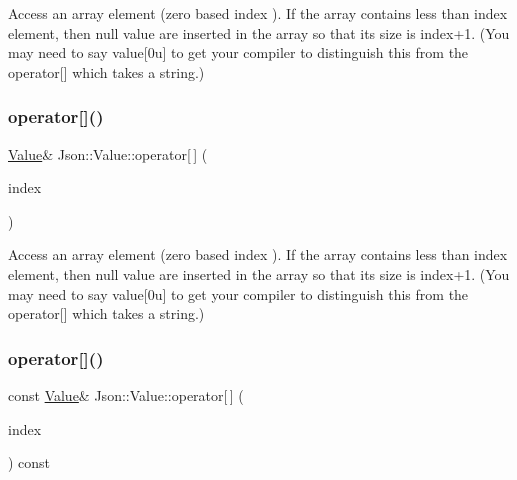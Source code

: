 Access an array element (zero based index ). If the array contains less than index element, then null value are inserted in the array so that its size is index+1. (You may need to say \textquotesingle{}value\mbox{[}0u\mbox{]}\textquotesingle{} to get your compiler to distinguish this from the operator\mbox{[}\mbox{]} which takes a string.) \hypertarget{class_json_1_1_value_ad4b78dd032292ab1d91a3f89110b0d0e}{}\label{class_json_1_1_value_ad4b78dd032292ab1d91a3f89110b0d0e} 
\subsubsection{\texorpdfstring{operator[]()}{operator[]()}\hspace{0.1cm}{\footnotesize\ttfamily [2/18]}}
{\footnotesize\ttfamily \hyperlink{class_json_1_1_value}{Value}\& Json\+::\+Value\+::operator\mbox{[}$\,$\mbox{]} (\begin{DoxyParamCaption}\item[{int}]{index }\end{DoxyParamCaption})}

Access an array element (zero based index ). If the array contains less than index element, then null value are inserted in the array so that its size is index+1. (You may need to say \textquotesingle{}value\mbox{[}0u\mbox{]}\textquotesingle{} to get your compiler to distinguish this from the operator\mbox{[}\mbox{]} which takes a string.) \hypertarget{class_json_1_1_value_a3b1aece4ef292926e2bdb42fed925508}{}\label{class_json_1_1_value_a3b1aece4ef292926e2bdb42fed925508} 
\subsubsection{\texorpdfstring{operator[]()}{operator[]()}\hspace{0.1cm}{\footnotesize\ttfamily [3/18]}}
{\footnotesize\ttfamily const \hyperlink{class_json_1_1_value}{Value}\& Json\+::\+Value\+::operator\mbox{[}$\,$\mbox{]} (\begin{DoxyParamCaption}\item[{\hyperlink{class_json_1_1_value_a184a91566cccca7b819240f0d5561c7d}{Array\+Index}}]{index }\end{DoxyParamCaption}) const}

